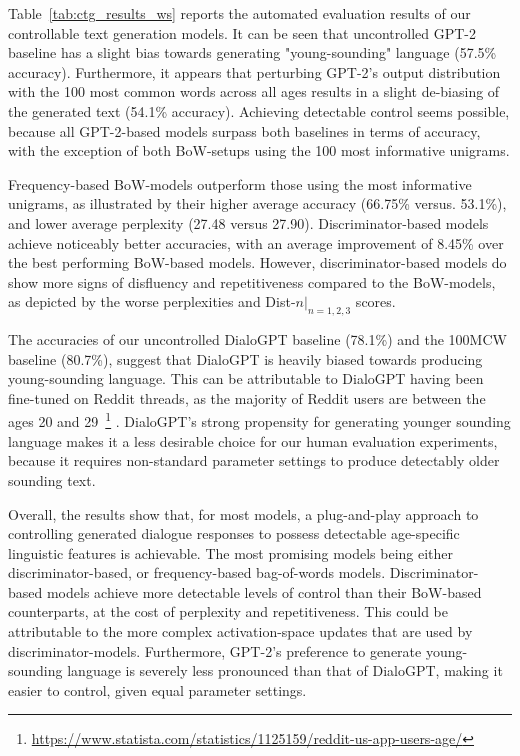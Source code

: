 Table~\ref{tab:ctg_results_ws} reports the automated evaluation results of our controllable text generation models. It can be seen that uncontrolled GPT-2 baseline has a slight bias towards generating "young-sounding" language (57.5\% accuracy). Furthermore, it appears that perturbing GPT-2's output distribution with the 100 most common words across all ages results in a slight de-biasing of the generated text (54.1\% accuracy). Achieving detectable control seems possible, because all GPT-2-based models surpass both baselines in terms of accuracy, with the exception of both BoW-setups using the 100 most informative unigrams.

Frequency-based BoW-models outperform those using the most informative unigrams, as illustrated by their higher average accuracy (66.75\% versus. 53.1\%), and lower average perplexity (27.48 versus 27.90). 
Discriminator-based models achieve noticeably better accuracies, with an average improvement of 8.45\% over the best performing BoW-based models. However, discriminator-based models do show more signs of disfluency and repetitiveness compared to the BoW-models, as depicted by the worse perplexities and Dist-$n |_{n = 1,2,3}$ scores.

The accuracies of our uncontrolled DialoGPT baseline (78.1\%) and the 100MCW baseline (80.7\%), suggest that DialoGPT is heavily biased towards producing young-sounding language. This can be attributable to DialoGPT having been fine-tuned on Reddit threads, as the majority of Reddit users are between the ages 20 and 29~\footnote{\url{https://www.statista.com/statistics/1125159/reddit-us-app-users-age/}}
\citep{zhang2019dialogpt}. DialoGPT's strong propensity for generating younger sounding language makes it a less desirable choice for our human evaluation experiments, because it requires non-standard parameter settings to produce detectably older sounding text.

Overall, the results show that, for most models, a plug-and-play approach to controlling generated dialogue responses to possess detectable age-specific linguistic features is achievable. The most promising models being either discriminator-based, or frequency-based bag-of-words models. Discriminator-based models achieve more detectable levels of control than their BoW-based counterparts, at the cost of perplexity and repetitiveness. This could be attributable to the more complex activation-space updates that are used by discriminator-models. Furthermore, GPT-2's preference to generate young-sounding language is severely less pronounced than that of DialoGPT, making it easier to control, given equal parameter settings.


